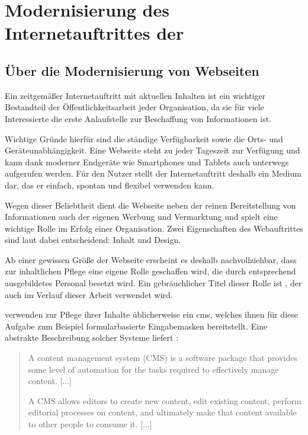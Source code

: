 \chapter{Modernisierung des Internetauftrittes der \fernUni}
    \label{chapter:FernUniRelaunch}
    \section{Über die Modernisierung von Webseiten}
        \label{section:aboutWebsiteRelaunches}
        Ein zeitgemäßer Internetauftritt mit aktuellen Inhalten
        ist ein wichtiger Bestandteil der Öffentlichkeitsarbeit jeder Organisation,
        da sie für viele Interessierte die erste Anlaufstelle zur Beschaffung von Informationen ist.
        
        Wichtige Gründe hierfür sind die ständige Verfügbarkeit sowie die Orts-
        und Geräteunabhängigkeit.
        Eine Webseite steht zu jeder Tageszeit zur Verfügung und kann
        dank moderner Endgeräte wie Smartphones und Tablets
        auch unterwegs aufgerufen werden.
        Für den Nutzer stellt der Internetauftritt deshalb ein Medium dar,
        das er einfach, spontan und flexibel verwenden kann.

        Wegen dieser Beliebtheit dient die Webseite neben der reinen Bereitstellung von Informationen
        auch der eigenen Werbung und Vermarktung und spielt eine wichtige Rolle im Erfolg einer Organisation.
        Zwei Eigenschaften des Webauftrittes sind laut \cite{sillence:onlineHealthSites} dabei
        entscheidend: Inhalt und Design.

        Ab einer gewissen Größe der Webseite erscheint es deshalb nachvollziehbar,
        dass zur inhaltlichen Pflege eine eigene Rolle geschaffen wird,
        die durch entsprechend ausgebildetes Personal besetzt wird.
        Ein gebräuchlicher Titel dieser Rolle ist \textit{\editor},
        der auch im Verlauf dieser Arbeit verwendet wird.

        \editors verwenden zur Pflege ihrer Inhalte üblicherweise ein \gls{cms},
        welches ihnen für diese Aufgabe zum Beispiel formularbasierte Eingabemasken bereitstellt.
        Eine abstrakte Beschreibung solcher Systeme liefert \cite[][Seite 5,6]{barker:webCMS}:

        \begin{quote}
            A content management system (CMS) is a software package that provides
            some level of automation for the tasks required to effectively manage content.
            [...]

            A CMS allows editors to create new content, edit existing content,
            perform editorial processes on content, and ultimately make that content
            available to other people to consume it.
            [...]
        \end{quote}

